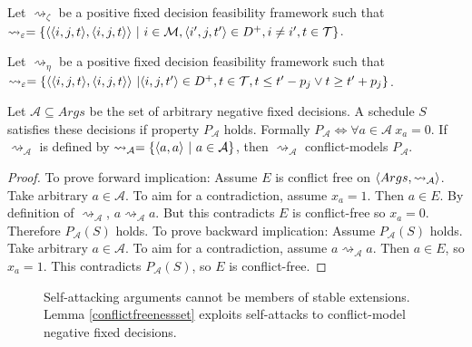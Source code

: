 \begin{definition}
	\label{intervalzeta}
	
	Let $\rightsquigarrow_\zeta$ be a positive fixed decision feasibility framework such that
	$\rightsquigarrow_\varepsilon=\{\pair{\triple{i}{j}{t}}{\triple{i}{j}{t}}\ |\ i\in\mathcal{M}, \triple{i'}{j}{t'}\in D^+, i\neq i', t\in\mathcal{T}\}$.
\end{definition}

\begin{definition}
	\label{intervaleta}
	
	Let $\rightsquigarrow_\eta$ be a positive fixed decision feasibility framework such that
	$\rightsquigarrow_\varepsilon=\{\pair{\triple{i}{j}{t}}{\triple{i}{j}{t}}\ |\triple{i}{j}{t'}\in D^+, t\in\mathcal{T}, t\leq t'-p_j\lor t\geq t'+p_j\}$.
\end{definition}

\begin{lemma}
	\label{conflictfreenessset}
	Let $\mathcal{A}\subseteq Args$ be the set of arbitrary negative fixed decisions. A schedule $S$ satisfies these decisions if property $P_\mathcal{A}$ holds. Formally $P_\mathcal{A}\iff\forall a\in\mathcal{A}\ x_a=0$. If $\rightsquigarrow_\mathcal{A}$ is defined by $\rightsquigarrow_\mathcal{A}=\{\pair{a}{a}\ |\ a\in\mathcal{A}\}$, then $\rightsquigarrow_\mathcal{A}$ conflict-models $P_\mathcal{A}$.

	\begin{proof}
		To prove forward implication: Assume $E$ is conflict free on $\langle{Args},{\rightsquigarrow_\mathcal{A}}\rangle$. Take arbitrary $a\in\mathcal{A}$. To aim for a contradiction, assume $x_a=1$. Then $a\in E$. By definition of $\rightsquigarrow_\mathcal{A}$, $a\rightsquigarrow_\mathcal{A} a$. But this contradicts $E$ is conflict-free so $x_a=0$. Therefore $P_\mathcal{A}(S)$ holds.
		\linespace
		To prove backward implication: Assume $P_\mathcal{A}(S)$ holds. Take arbitrary $a\in\mathcal{A}$. To aim for a contradiction, assume $a\rightsquigarrow_\mathcal{A}a$. Then $a\in E$, so $x_a=1$. This contradicts $P_\mathcal{A}(S)$, so $E$ is conflict-free.
	\end{proof}
\end{lemma}

\begin{figure}[H]
	\centering
	\caption{Self-attacking arguments cannot be members of stable extensions. Lemma \ref{conflictfreenessset} exploits self-attacks to conflict-model negative fixed decisions.}
\end{figure}

